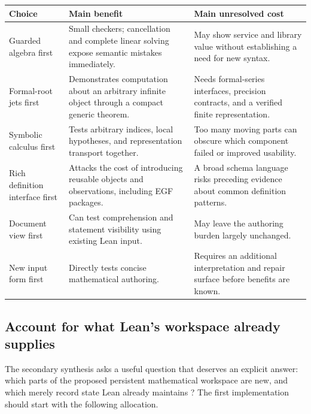 \documentclass[11pt,letterpaper]{article}
\begin{document}
\begin{center}\small
\begin{tabularx}{\textwidth}{@{}P{1.25in}Y Y@{}}
\toprule
Choice & Main benefit & Main unresolved cost\\
\midrule
Guarded algebra first & Small checkers; cancellation and complete linear solving
expose semantic mistakes immediately. & May show service and library value
without establishing a need for new syntax.\\
Formal-root jets first & Demonstrates computation about an arbitrary infinite
object through a compact generic theorem. & Needs formal-series interfaces,
precision contracts, and a verified finite representation.\\
Symbolic calculus first & Tests arbitrary indices, local hypotheses, and
representation transport together. & Too many moving parts can obscure which
component failed or improved usability.\\
Rich definition interface first & Attacks the cost of introducing reusable
objects and observations, including EGF packages. & A broad schema language
risks preceding evidence about common definition patterns.\\
Document view first & Can test comprehension and statement visibility using
existing Lean input. & May leave the authoring burden largely unchanged.\\
New input form first & Directly tests concise mathematical authoring. & Requires
an additional interpretation and repair surface before benefits are known.\\
\bottomrule
\end{tabularx}
\end{center}

\subsection{Account for what Lean's workspace already supplies}\label{sec:workspace}
The secondary synthesis asks a useful question that deserves an explicit answer:
which parts of the proposed persistent mathematical workspace are new, and
which merely record state Lean already maintains \cite[\S8.2]{secondary}?
The first implementation should start with the following allocation.
\end{document}

